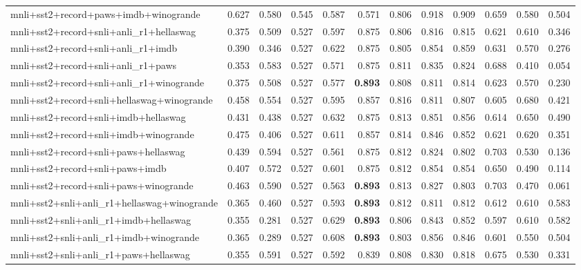 \begin{table}[t]
\begin{tabular}{lrrrrrrrrrrr}
    mnli+sst2+record+paws+imdb+winogrande & 0.627 & 0.580 & 0.545 & 0.587 & 0.571 & 0.806 & 0.918 & 0.909 & 0.659 & 0.580 & 0.504 \\
    mnli+sst2+record+snli+anli\_r1+hellaswag & 0.375 & 0.509 & 0.527 & 0.597 & 0.875 & 0.806 & 0.816 & 0.815 & 0.621 & 0.610 & 0.346 \\
    mnli+sst2+record+snli+anli\_r1+imdb & 0.390 & 0.346 & 0.527 & 0.622 & 0.875 & 0.805 & 0.854 & 0.859 & 0.631 & 0.570 & 0.276 \\
    mnli+sst2+record+snli+anli\_r1+paws & 0.353 & 0.583 & 0.527 & 0.571 & 0.875 & 0.811 & 0.835 & 0.824 & 0.688 & 0.410 & 0.054 \\
    mnli+sst2+record+snli+anli\_r1+winogrande & 0.375 & 0.508 & 0.527 & 0.577 & \textbf{0.893} & 0.808 & 0.811 & 0.814 & 0.623 & 0.570 & 0.230 \\
    mnli+sst2+record+snli+hellaswag+winogrande & 0.458 & 0.554 & 0.527 & 0.595 & 0.857 & 0.816 & 0.811 & 0.807 & 0.605 & 0.680 & 0.421 \\
    mnli+sst2+record+snli+imdb+hellaswag & 0.431 & 0.438 & 0.527 & 0.632 & 0.875 & 0.813 & 0.851 & 0.856 & 0.614 & 0.650 & 0.490 \\
    mnli+sst2+record+snli+imdb+winogrande & 0.475 & 0.406 & 0.527 & 0.611 & 0.857 & 0.814 & 0.846 & 0.852 & 0.621 & 0.620 & 0.351 \\
    mnli+sst2+record+snli+paws+hellaswag & 0.439 & 0.594 & 0.527 & 0.561 & 0.875 & 0.812 & 0.824 & 0.802 & 0.703 & 0.530 & 0.136 \\
    mnli+sst2+record+snli+paws+imdb & 0.407 & 0.572 & 0.527 & 0.601 & 0.875 & 0.812 & 0.854 & 0.854 & 0.650 & 0.490 & 0.114 \\
    mnli+sst2+record+snli+paws+winogrande & 0.463 & 0.590 & 0.527 & 0.563 & \textbf{0.893} & 0.813 & 0.827 & 0.803 & 0.703 & 0.470 & 0.061 \\
    mnli+sst2+snli+anli\_r1+hellaswag+winogrande & 0.365 & 0.460 & 0.527 & 0.593 & \textbf{0.893} & 0.812 & 0.811 & 0.812 & 0.612 & 0.610 & 0.583 \\
    mnli+sst2+snli+anli\_r1+imdb+hellaswag & 0.355 & 0.281 & 0.527 & 0.629 & \textbf{0.893} & 0.806 & 0.843 & 0.852 & 0.597 & 0.610 & 0.582 \\
    mnli+sst2+snli+anli\_r1+imdb+winogrande & 0.365 & 0.289 & 0.527 & 0.608 & \textbf{0.893} & 0.803 & 0.856 & 0.846 & 0.601 & 0.550 & 0.504 \\
    mnli+sst2+snli+anli\_r1+paws+hellaswag & 0.355 & 0.591 & 0.527 & 0.592 & 0.839 & 0.808 & 0.830 & 0.818 & 0.675 & 0.530 & 0.331 \\

\end{tabular}
\end{table}
